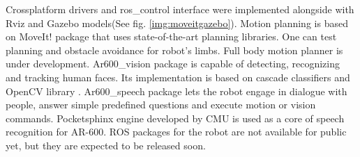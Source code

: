 \documentclass[letterpaper, 10 pt, conference]{ieeeconf}  %
\begin{document}
Crossplatform drivers and ros\_control interface were implemented alongside
with Rviz and Gazebo models(See fig. \ref{img:moveitgazebo}). Motion planning
is based on MoveIt! package \cite{c3} that uses state-of-the-art planning libraries. One can test planning
and obstacle avoidance for robot's limbs. Full body motion planner is under
development. Ar600\_vision package is capable of detecting, recognizing and
tracking human faces. Its implementation is based on cascade classifiers and
OpenCV library \cite{c4}. Ar600\_speech package lets the robot engage in
dialogue with people, answer simple predefined questions and execute motion or vision
commands. Pocketsphinx engine \cite{c5} developed by CMU is used as a core of
speech recognition for AR-600. ROS packages for the robot are not available for
public yet, but they are expected to be released soon.
\begin{figure}[thpb] 
\end{figure}
\end{document}
